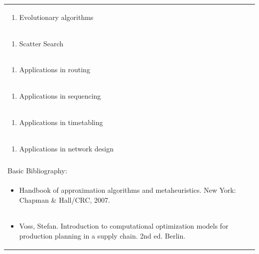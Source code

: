 \documentclass[11pt]{article}
\begin{document}
\begin{center}
\begin{longtable}{|p{4cm}|p{4cm}|p{4cm}|p{4cm}|}
\multicolumn{4}{|p{\dimexpr 16cm + 6\tabcolsep\relax}|}{\begin{enumerate}[start=12]\item Evolutionary algorithms\end{enumerate}}\\
\multicolumn{4}{|p{\dimexpr 16cm + 6\tabcolsep\relax}|}{\begin{enumerate}[start=13]\item Scatter Search\end{enumerate}}\\
\multicolumn{4}{|p{\dimexpr 16cm + 6\tabcolsep\relax}|}{\begin{enumerate}[start=14]\item Applications in routing\end{enumerate}}\\
\multicolumn{4}{|p{\dimexpr 16cm + 6\tabcolsep\relax}|}{\begin{enumerate}[start=15]\item Applications in sequencing\end{enumerate}}\\
\multicolumn{4}{|p{\dimexpr 16cm + 6\tabcolsep\relax}|}{\begin{enumerate}[start=16]\item Applications in timetabling\end{enumerate}}\\
\multicolumn{4}{|p{\dimexpr 16cm + 6\tabcolsep\relax}|}{\begin{enumerate}[start=17]\item Applications in network design\end{enumerate}}\\
\multicolumn{4}{|p{\dimexpr 16cm + 6\tabcolsep\relax}|}{}\\
\hline
\multicolumn{4}{|p{16cm}|}{Basic Bibliography:}\\*
\multicolumn{4}{|p{\dimexpr 16cm + 6\tabcolsep\relax}|}{\begin{itemize}\item Handbook of approximation algorithms and metaheuristics. New York: Chapman \& Hall/CRC, 2007.\end{itemize}}\\
\multicolumn{4}{|p{\dimexpr 16cm + 6\tabcolsep\relax}|}{\begin{itemize}\item Voss, Stefan. Introduction to computational optimization models for production planning in a supply chain. 2nd ed. Berlin.\end{itemize}}\\

\end{longtable}
\end{center}
\end{document}
